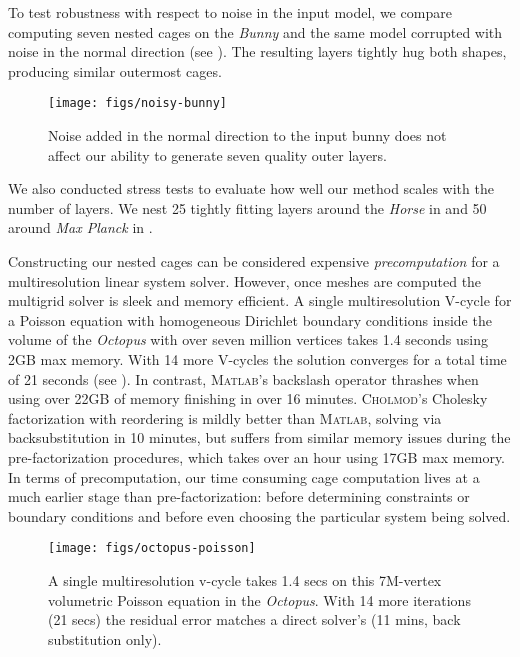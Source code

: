 To test robustness with respect to noise in the input model,
we compare computing seven nested cages on the \emph{Bunny} and the same model
corrupted with noise in the normal direction (see ). The
resulting layers tightly hug both shapes, producing similar outermost cages.

\begin{figure}
  \texttt{[image: figs/noisy-bunny]}
  \caption{Noise added in the normal direction to the input bunny does not
  affect our ability to generate seven quality outer layers.}
  \label{fig:noisy-bunny}
\end{figure}

We also conducted stress tests to evaluate how well our method scales with the
number of layers. We nest 25 tightly fitting layers around the \emph{Horse} in
 and 50 around \emph{Max Planck} in .

%
Constructing our nested cages can be considered expensive \emph{precomputation}
for a multiresolution linear system solver.
%
However, once meshes are computed the multigrid solver is sleek and memory
efficient.
%
A single multiresolution V-cycle for a Poisson equation with homogeneous
Dirichlet boundary conditions inside the volume of the \emph{Octopus} with over
seven million vertices takes 1.4 seconds using 2GB max memory. With 14 more
V-cycles the solution converges for a total time of 21 seconds (see
).
%
In contrast, \textsc{Matlab}'s backslash operator thrashes when using over 22GB
of memory finishing in over 16 minutes.
%
\textsc{Cholmod}'s Cholesky factorization with reordering is mildly better than
\textsc{Matlab}, solving via backsubstitution in 10 minutes, but suffers from
similar memory issues during the pre-factorization procedures, which takes over
an hour using 17GB max memory.
%
In terms of precomputation, our time consuming cage computation lives at a much
earlier stage than pre-factorization: before determining constraints or
boundary conditions and before even choosing the particular system being
solved.


\begin{figure}
  \texttt{[image: figs/octopus-poisson]}
  \caption{A single multiresolution v-cycle takes 1.4 secs on this 7M-vertex
  volumetric Poisson equation in the \emph{Octopus}. With 14 more iterations
  (21 secs) the residual error matches a direct solver's (11 mins, back
  substitution only).}
  \label{fig:octopus-poisson}
\end{figure}

